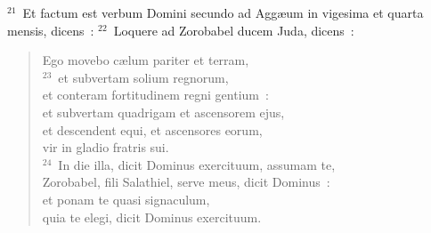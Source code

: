 ${}^{21}$~Et factum est verbum Domini secundo ad Agg\ae um in vigesima et quarta mensis, dicens~:
${}^{22}$~Loquere ad Zorobabel ducem Juda, dicens~: \begin{flushleft}\begin{verse}Ego movebo c\ae lum pariter et terram,\\
${}^{23}$~et subvertam solium regnorum,\\ et conteram fortitudinem regni gentium~:\\ et subvertam quadrigam et ascensorem ejus,\\ et descendent equi, et ascensores eorum,\\ vir in gladio fratris sui.\\
${}^{24}$~In die illa, dicit Dominus exercituum, assumam te,\\ Zorobabel, fili Salathiel, serve meus, dicit Dominus~:\\ et ponam te quasi signaculum,\\ quia te elegi, dicit Dominus exercituum.\end{verse}\end{flushleft}


